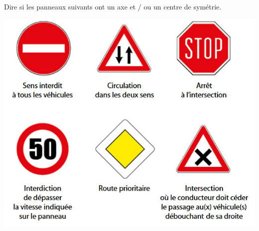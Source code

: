 \documentclass[12pt,a4paper]{article}
\begin{document}
\begin{myapp}
	Dire si les panneaux suivants ont un axe et / ou un centre de symétrie.
	
	\begin{center}
		\includegraphics[scale=0.43]{app}
	\end{center}
\end{myapp}
\end{document}
